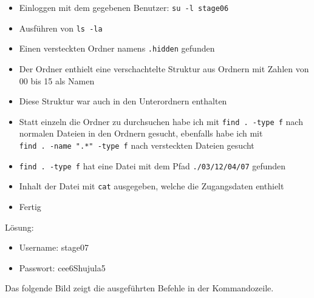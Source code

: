 \documentclass[12pt, a4paper, titlepage, oneside]{scrartcl}
\begin{document}
	\begin{itemize}
		\item Einloggen mit dem gegebenen Benutzer: \lstinline{su -l stage06}

		\item Ausführen von \lstinline{ls -la}

		\item Einen versteckten Ordner namens \lstinline{.hidden} gefunden

		\item Der Ordner enthielt eine verschachtelte Struktur aus Ordnern mit Zahlen
			von 00 bis 15 als Namen

		\item Diese Struktur war auch in den Unterordnern enthalten

		\item Statt einzeln die Ordner zu durchsuchen habe ich mit \lstinline{find . -type f}
			nach normalen Dateien in den Ordnern gesucht, ebenfalls habe ich mit \\ \lstinline{find . -name ".*" -type f}
			nach versteckten Dateien gesucht

		\item \lstinline{find . -type f} hat eine Datei mit dem Pfad \lstinline{./03/12/04/07}
			gefunden

		\item Inhalt der Datei mit \lstinline{cat} ausgegeben, welche die Zugangsdaten
			enthielt

		\item Fertig
	\end{itemize}

	Lösung:
	\begin{itemize}
		\item Username: stage07

		\item Passwort: cee6Shujula5
	\end{itemize}

	Das folgende Bild zeigt die ausgeführten Befehle in der Kommandozeile.
\end{document}
